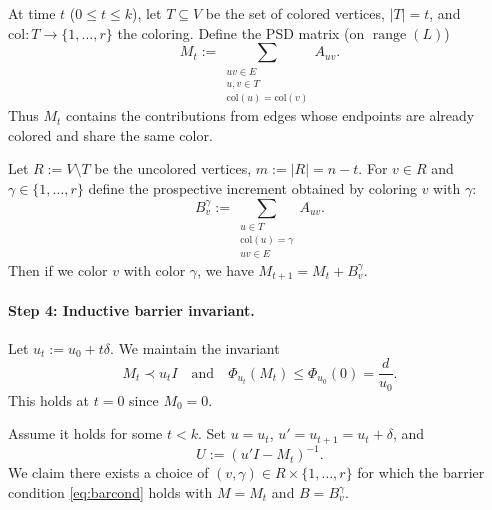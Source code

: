 \documentclass{article}
\begin{document}
At time $t$ ($0 \le t \le k$), let $T \subseteq V$ be the set of colored vertices, $|T| = t$, and
$\mathrm{col} : T \to \{1, \ldots, r\}$ the coloring. Define the PSD matrix (on $\operatorname{range}(L)$)
\begin{equation}
  M_t := \sum_{\substack{uv \in E \\ u,v \in T \\ \mathrm{col}(u) = \mathrm{col}(v)}} A_{uv}. \label{eq:Mt}
\end{equation}
Thus $M_t$ contains the contributions from edges whose endpoints are already colored and share
the same color.

Let $R := V \setminus T$ be the uncolored vertices, $m := |R| = n - t$. For $v \in R$ and
$\gamma \in \{1, \ldots, r\}$ define the prospective increment obtained by coloring $v$ with $\gamma$:
\begin{equation}
  B_v^\gamma := \sum_{\substack{u \in T \\ \mathrm{col}(u) = \gamma \\ uv \in E}} A_{uv}. \label{eq:Bvg}
\end{equation}
Then if we color $v$ with color $\gamma$, we have $M_{t+1} = M_t + B_v^\gamma$.

\paragraph{Step 4: Inductive barrier invariant.}
Let $u_t := u_0 + t\delta$. We maintain the invariant
\begin{equation}
  M_t \prec u_t I \quad \text{and} \quad \Phi_{u_t}(M_t) \le \Phi_{u_0}(0) = \frac{d}{u_0}. \label{eq:inv}
\end{equation}
This holds at $t = 0$ since $M_0 = 0$.

Assume it holds for some $t < k$. Set $u = u_t$, $u' = u_{t+1} = u_t + \delta$, and
\[
  U := (u'I - M_t)^{-1}.
\]
We claim there exists a choice of $(v, \gamma) \in R \times \{1, \ldots, r\}$ for which the barrier
condition \eqref{eq:barcond} holds with $M = M_t$ and $B = B_v^\gamma$.
\end{document}
